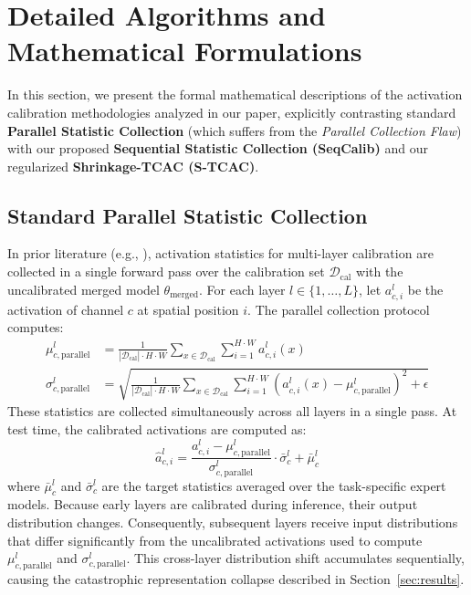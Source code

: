 \documentclass{article}
\theoremstyle{plain}
\theoremstyle{definition}
\theoremstyle{remark}
\begin{document}



\newpage
\appendix
\onecolumn

\section{Detailed Algorithms and Mathematical Formulations}
\label{app:algorithms}

In this section, we present the formal mathematical descriptions of the activation calibration methodologies analyzed in our paper, explicitly contrasting standard \textbf{Parallel Statistic Collection} (which suffers from the \textit{Parallel Collection Flaw}) with our proposed \textbf{Sequential Statistic Collection (SeqCalib)} and our regularized \textbf{Shrinkage-TCAC (S-TCAC)}.

\subsection{Standard Parallel Statistic Collection}
In prior literature (e.g., \cite{lsc2026}), activation statistics for multi-layer calibration are collected in a single forward pass over the calibration set $\mathcal{D}_{\text{cal}}$ with the uncalibrated merged model $\theta_{\text{merged}}$. For each layer $l \in \{1, \dots, L\}$, let $a^l_{c, i}$ be the activation of channel $c$ at spatial position $i$. The parallel collection protocol computes:
\begin{align}
\mu^l_{c, \text{parallel}} &= \frac{1}{|\mathcal{D}_{\text{cal}}| \cdot H \cdot W} \sum_{x \in \mathcal{D}_{\text{cal}}} \sum_{i=1}^{H \cdot W} a^l_{c, i}(x) \\
\sigma^l_{c, \text{parallel}} &= \sqrt{\frac{1}{| \mathcal{D}_{\text{cal}} | \cdot H \cdot W} \sum_{x \in \mathcal{D}_{\text{cal}}} \sum_{i=1}^{H \cdot W} (a^l_{c, i}(x) - \mu^l_{c, \text{parallel}})^2 + \epsilon}
\end{align}
These statistics are collected simultaneously across all layers in a single pass. At test time, the calibrated activations are computed as:
\begin{equation}
\hat{a}^l_{c, i} = \frac{a^l_{c, i} - \mu^l_{c, \text{parallel}}}{\sigma^l_{c, \text{parallel}}} \cdot \bar{\sigma}^l_c + \bar{\mu}^l_c
\end{equation}
where $\bar{\mu}^l_c$ and $\bar{\sigma}^l_c$ are the target statistics averaged over the task-specific expert models. 
Because early layers are calibrated during inference, their output distribution changes. Consequently, subsequent layers receive input distributions that differ significantly from the uncalibrated activations used to compute $\mu^l_{c, \text{parallel}}$ and $\sigma^l_{c, \text{parallel}}$. This cross-layer distribution shift accumulates sequentially, causing the catastrophic representation collapse described in Section~\ref{sec:results}.
\end{document}
